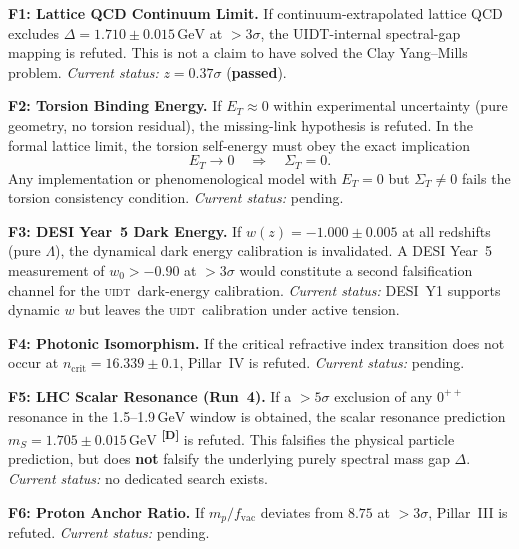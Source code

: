 \documentclass[12pt,a4paper,twoside]{article}
\theoremstyle{plain}
\theoremstyle{definition}
\theoremstyle{remark}
\newcommand{\UIDT}{\textsc{uidt}}
\newcommand{\GeV}{\,\mathrm{GeV}}
\newcommand{\catmark}[1]{\textsuperscript{\textsf{\textbf{[#1]}}}}
\newcommand{\DeltaGap}{1.710 \pm 0.015\GeV}        %
\newcommand{\GammaGeom}{16.339}                     %
\begin{document}
\begin{killswitch}
\textbf{F1: Lattice QCD Continuum Limit.}
If continuum-extrapolated lattice QCD excludes $\Delta = \DeltaGap$ at
$> 3\sigma$, the UIDT-internal spectral-gap mapping is refuted. This is not a
claim to have solved the Clay Yang--Mills problem. \emph{Current status:}
$z = 0.37\sigma$ (\textbf{passed}).
\end{killswitch}
\vspace{0.5em}
\begin{killswitch}
\textbf{F2: Torsion Binding Energy.}
If $E_T \approx 0$ within experimental uncertainty (pure geometry, no torsion
residual), the missing-link hypothesis is refuted. In the formal lattice
limit, the torsion self-energy must obey the exact implication
\[
  E_T \to 0 \quad \Longrightarrow \quad \Sigma_T = 0 .
\]
Any implementation or phenomenological model with $E_T=0$ but
$\Sigma_T\ne0$ fails the torsion consistency condition. \emph{Current status:}
pending.
\end{killswitch}
\vspace{0.5em}
\begin{killswitch}
\textbf{F3: DESI Year~5 Dark Energy.}
If $w(z) = -1.000 \pm 0.005$ at all redshifts (pure $\Lambda$), the dynamical
dark energy calibration is invalidated. A DESI Year~5 measurement of
$w_0 > -0.90$ at $>3\sigma$ would constitute a second falsification channel
for the \UIDT\ dark-energy calibration. \emph{Current status:} DESI~Y1
supports dynamic $w$ but leaves the \UIDT\ calibration under active tension.
\end{killswitch}
\vspace{0.5em}
\begin{killswitch}
\textbf{F4: Photonic Isomorphism.}
If the critical refractive index transition does not occur at
$n_{\mathrm{crit}} = \GammaGeom \pm 0.1$, Pillar~IV is refuted. \emph{Current
status:} pending.
\end{killswitch}
\vspace{0.5em}
\begin{killswitch}
\textbf{F5: LHC Scalar Resonance (Run~4).}
If a $> 5\sigma$ exclusion of any $0^{++}$ resonance in the 1.5--1.9$\GeV$
window is obtained, the scalar resonance prediction $m_S = 1.705 \pm 0.015\GeV$
\catmark{D} is refuted. This falsifies the physical particle prediction, but does
\textbf{not} falsify the underlying purely spectral mass gap $\Delta$.
\emph{Current status:} no dedicated search exists.
\end{killswitch}
\vspace{0.5em}
\begin{killswitch}
\textbf{F6: Proton Anchor Ratio.}
If $m_p / f_{\mathrm{vac}}$ deviates from $8.75$ at $> 3\sigma$, Pillar~III
is refuted. \emph{Current status:} pending.
\end{killswitch}
\end{document}
